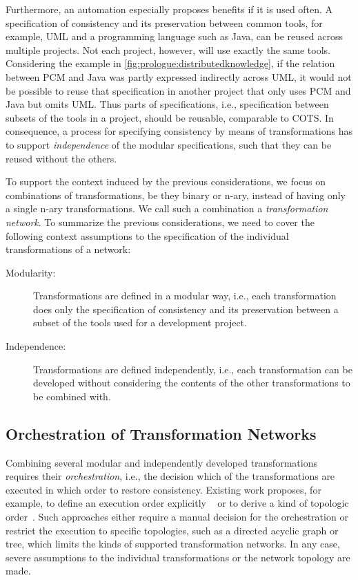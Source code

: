 Furthermore, an automation especially proposes benefits if it is used often.
A specification of consistency and its preservation between common tools, for example, \gls{UML} and a programming language such as Java, can be reused across multiple projects.
Not each project, however, will use exactly the same tools.
Considering the example in \autoref{fig:prologue:distributedknowledge}, if the relation between \gls{PCM} and Java was partly expressed indirectly across \gls{UML}, it would not be possible to reuse that specification in another project that only uses \gls{PCM} and Java but omits \gls{UML}.
Thus parts of specifications, i.e., specification between subsets of the tools in a project, should be reusable, comparable to \gls{COTS}.
In consequence, a process for specifying consistency by means of transformations has to support \emph{independence} of the modular specifications, such that they can be reused without the others.

To support the context induced by the previous considerations, we focus on combinations of transformations, be they binary or n-ary, instead of having only a single n-ary transformations.
We call such a combination a \emph{transformation network}.
To summarize the previous considerations, we need to cover the following context assumptions to the specification of the individual transformations of a network:
\begin{description}
    \item[Modularity:] Transformations are defined in a modular way, i.e., each transformation does only the specification of consistency and its preservation between a subset of the tools used for a development project.
    \item[Independence:] Transformations are defined independently, i.e., each transformation can be developed without considering the contents of the other transformations to be combined with.
\end{description}


\subsection{Orchestration of Transformation Networks}

Combining several modular and independently developed transformations requires their \emph{orchestration}, i.e., the decision which of the transformations are executed in which order to restore consistency.
Existing work proposes, for example, to define an execution order explicitly ~\cite{pilgrim2008a, vanhooff2007UniTI-MODELS} or to derive a kind of topologic order~\cite{stevens2020BidirectionalTransformationLargeSoSym}.
Such approaches either require a manual decision for the orchestration or restrict the execution to specific topologies, such as a directed acyclic graph or tree, which limits the kinds of supported transformation networks.
In any case, severe assumptions to the individual transformations or the network topology are made.

